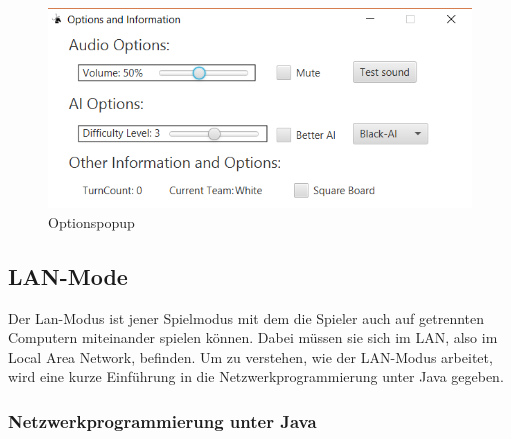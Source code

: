 \documentclass[12pt,a4paper]{article}
\begin{document}
{\begin{figure}[H]
  \centering
   	\includegraphics[width=14cm]{graphics/Menu.png}
  \caption{Optionspopup }
  \label{fig:options}
\end{figure}


\newpage
\subsection{LAN-Mode}

Der Lan-Modus ist jener Spielmodus mit dem die Spieler auch auf getrennten Computern miteinander spielen können. Dabei müssen sie sich im LAN, also im Local Area Network, befinden. Um zu verstehen, wie der LAN-Modus arbeitet, wird eine kurze Einführung in die Netzwerkprogrammierung unter Java gegeben. 

\subsubsection{Netzwerkprogrammierung unter Java}

}
\end{document}
